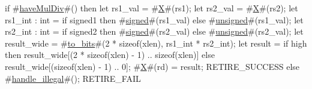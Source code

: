 if #\hyperref[sailRISCVzhaveMulDiv]{haveMulDiv}#() then {
  let rs1_val = #\hyperref[sailRISCVzX]{X}#(rs1);
  let rs2_val = #\hyperref[sailRISCVzX]{X}#(rs2);
  let rs1_int : int = if signed1 then #\hyperref[sailRISCVzsigned]{signed}#(rs1_val) else #\hyperref[sailRISCVzunsigned]{unsigned}#(rs1_val);
  let rs2_int : int = if signed2 then #\hyperref[sailRISCVzsigned]{signed}#(rs2_val) else #\hyperref[sailRISCVzunsigned]{unsigned}#(rs2_val);
  let result_wide = #\hyperref[sailRISCVztozybits]{to\_bits}#(2 * sizeof(xlen), rs1_int * rs2_int);
  let result = if   high
               then result_wide[(2 * sizeof(xlen) - 1) .. sizeof(xlen)]
               else result_wide[(sizeof(xlen) - 1) .. 0];
  #\hyperref[sailRISCVzX]{X}#(rd) = result;
  RETIRE_SUCCESS
} else {
  #\hyperref[sailRISCVzhandlezyillegal]{handle\_illegal}#();
  RETIRE_FAIL
}
